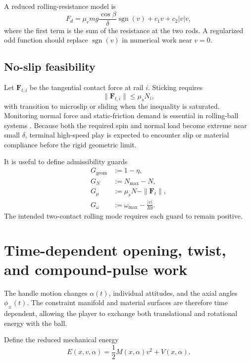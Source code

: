 \documentclass[11pt]{article}
\numberwithin{equation}{section}
\theoremstyle{definition}
\theoremstyle{remark}
\newcommand{\sgn}{\operatorname{sgn}}
\begin{document}
A reduced rolling-resistance model is
\begin{equation}
  F_d
  =\mu_rmg\frac{\cos\beta}{\delta}\sgn(v)
   +c_1v+c_2|v|v,
  \label{eq:dissipation}
\end{equation}
where the first term is the sum of the resistance at the two rods.  A regularized odd function should replace $\sgn(v)$ in numerical work near $v=0$.

\subsection{No-slip feasibility}

Let $\bm F_{t,i}$ be the tangential contact force at rail $i$.  Sticking requires
\begin{equation}
  \|\bm F_{t,i}\|\leq\mu_sN_i,
  \label{eq:frictioncone}
\end{equation}
with transition to microslip or sliding when the inequality is saturated.  Monitoring normal force and static-friction demand is essential in rolling-ball systems \citep{Putkaradze2018}.  Because both the required spin and normal load become extreme near small $\delta$, terminal high-speed play is expected to encounter slip or material compliance before the rigid geometric limit.

It is useful to define admissibility guards
\begin{align}
  G_{\mathrm{geom}}&:=1-\eta,\\
  G_N&:=N_{\max}-N,\\
  G_\mu&:=\mu_sN-\|\bm F_t\|,\\
  G_\omega&:=\omega_{\max}-\frac{|v|}{R\delta}.
  \label{eq:rigidguards}
\end{align}
The intended two-contact rolling mode requires each guard to remain positive.

\section{Time-dependent opening, twist, and compound-pulse work}

The handle motion changes $\alpha(t)$, individual attitudes, and the axial angles $\phi_\pm(t)$.  The constraint manifold and material surfaces are therefore time dependent, allowing the player to exchange both translational and rotational energy with the ball.

Define the reduced mechanical energy
\begin{equation}
  E(x,v,\alpha)=\frac12M(x,\alpha)v^2+V(x,\alpha).
  \label{eq:energy}
\end{equation}
\end{document}
